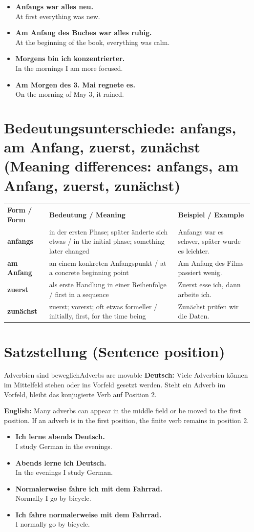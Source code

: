 \documentclass[a4paper,11pt]{article}
\newcommand{\GermanText}[1]{\textbf{Deutsch: }#1\par}
\newcommand{\EnglishText}[1]{{\small\color{SoftGray}\textbf{English: }#1\par}}
\newcommand{\ExampleItem}[2]{\item \textbf{#1}\\{\small\color{SoftGray}#2}}
\newcommand{\BSection}[2]{\section{#1 \textnormal{\small (#2)}}}
\begin{document}
\begin{exbox}
\begin{itemize}
\ExampleItem{Anfangs war alles neu.}{At first everything was new.}
\ExampleItem{Am Anfang des Buches war alles ruhig.}{At the beginning of the book, everything was calm.}
\ExampleItem{Morgens bin ich konzentrierter.}{In the mornings I am more focused.}
\ExampleItem{Am Morgen des 3. Mai regnete es.}{On the morning of May 3, it rained.}
\end{itemize}
\end{exbox}

\BSection{Bedeutungsunterschiede: anfangs, am Anfang, zuerst, zunächst}{Meaning differences: anfangs, am Anfang, zuerst, zunächst}

\begin{longtable}{>{\bfseries}p{2.8cm}|p{5.3cm}|p{5.7cm}}
\rowcolor{HeaderBlueDark}
\color{white}\textbf{Form / Form} & \color{white}\textbf{Bedeutung / Meaning} & \color{white}\textbf{Beispiel / Example} \\
anfangs & in der ersten Phase; später änderte sich etwas / in the initial phase; something later changed & Anfangs war es schwer, später wurde es leichter. \\
am Anfang & an einem konkreten Anfangspunkt / at a concrete beginning point & Am Anfang des Films passiert wenig. \\
zuerst & als erste Handlung in einer Reihenfolge / first in a sequence & Zuerst esse ich, dann arbeite ich. \\
zunächst & zuerst; vorerst; oft etwas formeller / initially, first, for the time being & Zunächst prüfen wir die Daten. \\
\end{longtable}

\BSection{Satzstellung}{Sentence position}

\begin{grammarentry}{Adverbien sind beweglich}{Adverbs are movable}
\GermanText{Viele Adverbien können im Mittelfeld stehen oder ins Vorfeld gesetzt werden. Steht ein Adverb im Vorfeld, bleibt das konjugierte Verb auf Position 2.}
\EnglishText{Many adverbs can appear in the middle field or be moved to the first position. If an adverb is in the first position, the finite verb remains in position 2.}
\end{grammarentry}

\begin{exbox}
\begin{itemize}
\ExampleItem{Ich lerne abends Deutsch.}{I study German in the evenings.}
\ExampleItem{Abends lerne ich Deutsch.}{In the evenings I study German.}
\ExampleItem{Normalerweise fahre ich mit dem Fahrrad.}{Normally I go by bicycle.}
\ExampleItem{Ich fahre normalerweise mit dem Fahrrad.}{I normally go by bicycle.}
\end{itemize}
\end{exbox}
\end{document}
